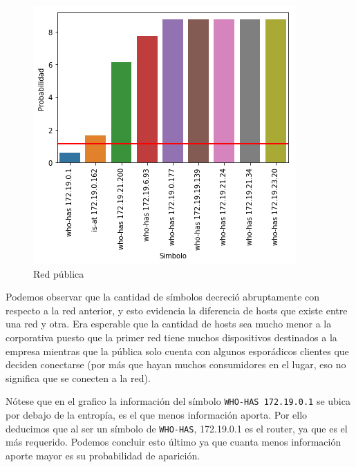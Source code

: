 \begin{figure}[H]
	\centering
	\includegraphics[width=.5\linewidth]{imagenes/mac_hosts}
	\caption{Red pública}
\end{figure}

Podemos observar que la cantidad de símbolos decreció abruptamente con respecto a la red anterior, y esto evidencia la diferencia de hosts que existe entre una red y otra. Era esperable que la cantidad de hosts sea mucho menor a la corporativa puesto que la primer red tiene muchos dispositivos destinados a la empresa mientras que la pública solo cuenta con algunos esporádicos clientes que deciden conectarse (por más que hayan muchos consumidores en el lugar, eso no significa que se conecten a la red).


Nótese que en el grafico la información del símbolo \texttt{WHO-HAS 172.19.0.1} se ubica por debajo de la entropía, es el que menos información aporta. Por ello deducimos que al ser un símbolo de \texttt{WHO-HAS}, 172.19.0.1 es el router, ya que es el más requerido. Podemos concluir esto último ya que cuanta menos información aporte mayor es su probabilidad de aparición.


 
